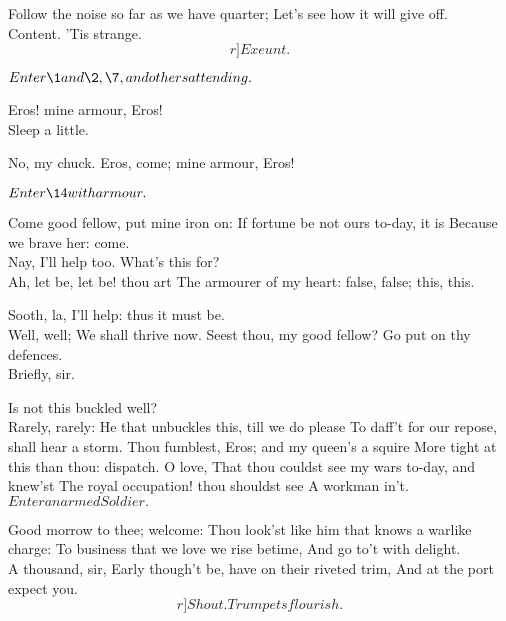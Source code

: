 \documentclass{book}
\begin{document}
	Follow the noise so far as we have quarter;
	Let's see how it will give off. \\

	Content. 'Tis strange. 	\[r]Exeunt.\]





	\(Enter \1 and \2, \7, and others\\ attending.\)

\1	Eros! mine armour, Eros! \\

\2	Sleep a little.

\1	No, my chuck. Eros, come; mine armour, Eros!


	\(Enter \14 with armour.\)

	Come good fellow, put mine iron on:
	If fortune be not ours to-day, it is
	Because we brave her: come. \\

\2	Nay, I'll help too.
	What's this for? \\

\1	                  Ah, let be, let be! thou art
	The armourer of my heart: false, false; this, this.

\2	Sooth, la, I'll help: thus it must be. \\

\1	Well, well;
	We shall thrive now. Seest thou, my good fellow?
	Go put on thy defences. \\

	Briefly, sir.

\2	Is not this buckled well? \\

\1	Rarely, rarely:
	He that unbuckles this, till we do please
	To daff't for our repose, shall hear a storm.
	Thou fumblest, Eros; and my queen's a squire
	More tight at this than thou: dispatch. O love,
	That thou couldst see my wars to-day, and knew'st
	The royal occupation! thou shouldst see
	A workman in't. \\

	\(Enter an armed Soldier.\)

	Good morrow to thee; welcome:
	Thou look'st like him that knows a warlike charge:
	To business that we love we rise betime,
	And go to't with delight. \\

	A thousand, sir,
	Early though't be, have on their riveted trim,
	And at the port expect you. 	\[r]Shout. Trumpets flourish.\]
\end{document}
